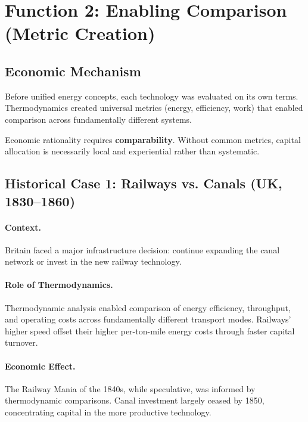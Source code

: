 \section{Function 2: Enabling Comparison (Metric Creation)}
\label{sec:thermo-comparison}

\subsection{Economic Mechanism}

Before unified energy concepts, each technology was evaluated on its own terms.
Thermodynamics created universal metrics (energy, efficiency, work) that
enabled comparison across fundamentally different systems.

\begin{tcolorbox}[colback=yellow!5!white, colframe=yellow!75!black,
    title=Core Insight: Metric Creation]
Economic rationality requires \textbf{comparability}. Without common metrics,
capital allocation is necessarily local and experiential rather than systematic.
\end{tcolorbox}

\subsection{Historical Case 1: Railways vs. Canals (UK, 1830--1860)}

\paragraph{Context.} Britain faced a major infrastructure decision: continue
expanding the canal network or invest in the new railway technology.

\paragraph{Role of Thermodynamics.} Thermodynamic analysis enabled comparison
of energy efficiency, throughput, and operating costs across fundamentally
different transport modes. Railways' higher speed offset their higher
per-ton-mile energy costs through faster capital turnover.

\paragraph{Economic Effect.} The Railway Mania of the 1840s, while speculative,
was informed by thermodynamic comparisons. Canal investment largely ceased
by 1850, concentrating capital in the more productive technology.

